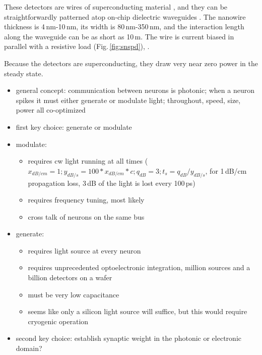 \documentclass[twocolumn]{article}
\begin{document}

These detectors are wires of superconducting material \cite{mave2013}, and they can be straightforwardly patterned atop on-chip dielectric waveguides \cite{shbu2017b,x,y,z}. The nanowire thickness is 4\,nm-10\,nm, its width is 80\,nm-350\,nm, and the interaction length along the waveguide can be as short as 10\,\textmu m. The wire is current biased in parallel with a resistive load (Fig.\,\ref{fig:snspd}), .

Because the detectors are superconducting, they draw very near zero power in the steady state. 



\begin{itemize}

\item general concept: communication between neurons is photonic; when a neuron spikes it must either generate or modulate light; throughout, speed, size, power all co-optimized

\item first key choice: generate or modulate

\item modulate:
\begin{itemize}
\item requires cw light running at all times ($x_{dB/cm} = 1; y_{dB/s} = 100*x_{dB/cm}*c; q_{dB} = 3; t_s = q_{dB}/y_{dB/s}$, for 1\,dB/cm propagation loss, 3\,dB of the light is lost every 100\,ps)
\item requires frequency tuning, most likely
\item cross talk of neurons on the same bus
\end{itemize}

\item generate:
\begin{itemize}
\item requires light source at every neuron
\item requires unprecedented optoelectronic integration, million sources and a billion detectors on a wafer
\item must be very low capacitance
\item seems like only a silicon light source will suffice, but this would require cryogenic operation
\end{itemize}

\item second key choice: establish synaptic weight in the photonic or electronic domain?


\end{itemize}
\end{document}
